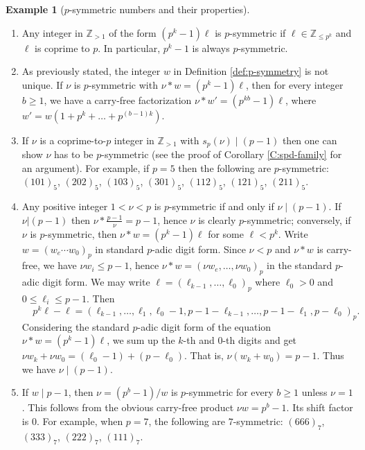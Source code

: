 \documentclass{amsart}
\numberwithin{equation}{section}
\newcommand{\Z}{\mathbb{Z}}
\theoremstyle{plain}
\theoremstyle{definition}
\newtheorem{example}[theorem]{Example}
\begin{document}
\begin{example}[$p$-symmetric numbers and their properties]
\label{ex:p-symmetry}
    \-
    \begin{enumerate}
    \item 
    Any integer in $\Z_{>1}$ of the form $(p^k - 1)\ell$ is $p$-symmetric 
    if $\ell\in\Z_{\le p^k}$ and $\ell$ is coprime to $p$.
    In particular, $p^k-1$ is always $p$-symmetric. 
    \item As previously stated, the integer $w$ in Definition
    \ref{def:p-symmetry} is not unique.
    If $\nu$ is $p$-symmetric with $\nu * w = (p^k-1)\ell$,
    then for every integer $b \ge 1$,
    we have a carry-free factorization
    $\nu * w' = (p^{kb}-1)\ell$,
    where $w' = w(1 + p^k + \dots + p^{(b-1)k})$.
\item 
If $\nu$ is a coprime-to-$p$ integer in $\Z_{>1}$ with $s_p(\nu)\mid (p-1)$
then one can show $\nu$ has to be $p$-symmetric (see the proof of
Corollary \ref{C:spd-family} for an argument).
For example, if $p=5$ then 
the following are $p$-symmetric: $(101)_5$,
$(202)_5$, $(103)_5$, $(301)_5$, $(112)_5$, $(121)_5$, $(211)_5$.

    \item Any positive integer $1<\nu<p$ is $p$-symmetric if and only if
    $\nu\mid (p-1)$. If $\nu|(p-1)$ 
then $\nu*\frac{p-1}{\nu} = p-1$, hence $\nu$ is clearly $p$-symmetric; 
conversely, if $\nu$ is $p$-symmetric, then $\nu* w=(p^k-1)\ell$ for some $\ell<p^k$.
Write $w=(w_e\cdots w_0)_p$ in standard $p$-adic digit form.
Since $\nu<p$ and $\nu*w$ is carry-free, we have $\nu w_i\le p-1$, 
hence $\nu *w =(\nu w_e, \ldots,\nu w_0)_p$ in the standard $p$-adic digit form.
We may write $\ell=(\ell_{k-1},\ldots,\ell_0)_p$ where $\ell_0>0$ and $0\le \ell_i\le p-1$.
Then 
$$ \;\;\; \; p^k\ell-\ell=(\ell_{k-1},\ldots,\ell_1,\ell_0-1, p-1-\ell_{k-1},\ldots,
p-1-\ell_1,p-\ell_0)_p.$$ 
Considering the standard $p$-adic digit form of the equation 
$\nu*w =(p^k-1)\ell$, we sum up 
the $k$-th and $0$-th digits and get 
$\nu w_k+\nu w_0 = (\ell_0-1)+(p-\ell_0)$.
That is, $\nu(w_k+w_0)=p-1$. Thus we have $\nu\mid (p-1)$.

    \item If $w \mid p-1$, 
    then $\nu=(p^b-1)/w$ is $p$-symmetric for every $b\ge 1$ unless $\nu=1$.
    This follows from the obvious carry-free product 
    $       \nu w = p^b - 1.
    $
Its shift factor is $0$.
   For example, when $p=7$, the following are $7$-symmetric: $(666)_7$,
   $(333)_7$, $(222)_7$, $(111)_7$.


\end{enumerate}
\end{example}
\end{document}
